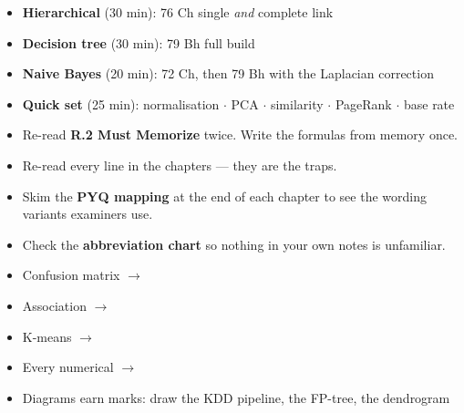 {\begin{itemize}
  \item[$\square$] \textbf{Hierarchical} (30 min): 76 Ch single \emph{and} complete link
  \item[$\square$] \textbf{Decision tree} (30 min): 79 Bh full build
  \item[$\square$] \textbf{Naive Bayes} (20 min): 72 Ch, then 79 Bh with the Laplacian correction
  \item[$\square$] \textbf{Quick set} (25 min): normalisation $\cdot$ PCA $\cdot$ similarity
        $\cdot$ PageRank $\cdot$ base rate
\end{itemize}
\begin{itemize}
  \item[$\square$] Re-read \textbf{R.2 Must Memorize} twice. Write the formulas from memory once.
  \item[$\square$] Re-read every  line in the chapters --- they are the traps.
  \item[$\square$] Skim the \textbf{PYQ mapping} at the end of each chapter to see the wording
        variants examiners use.
  \item[$\square$] Check the \textbf{abbreviation chart} so nothing in your own notes is unfamiliar.
\end{itemize}
\begin{itemize}
  \item[$\square$] Confusion matrix $\rightarrow$ 
  \item[$\square$] Association $\rightarrow$ 
  \item[$\square$] K-means $\rightarrow$ 
  \item[$\square$] Every numerical $\rightarrow$ 
  \item[$\square$] Diagrams earn marks: draw the KDD pipeline, the FP-tree, the dendrogram
\end{itemize}}
